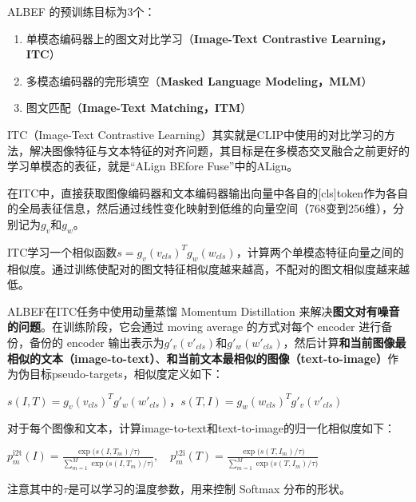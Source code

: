 \documentclass[zihao=false,fontset=windows]{ctexart}
\newcommand{\incode}[1]{\colorbox{inlinebg}{\ttfamily\small #1}}
\newcommand{\bigmath}[1]{%
  \begin{center}\large$\displaystyle #1$\end{center}%
}
\begin{document}
\par\vspace{0.95em}\par\vspace{0.28em}
ALBEF 的预训练目标为3个：\par
\begin{enumerate}
\item 单模态编码器上的图文对比学习（\textbf{Image-Text Contrastive Learning，ITC}）
\item 多模态编码器的完形填空（\textbf{Masked Language Modeling，MLM}）
\item 图文匹配（\textbf{Image-Text Matching，ITM}）
\end{enumerate}
\par\vspace{0.75em}\par\vspace{0.28em}
ITC（Image-Text Contrastive Learning）其实就是CLIP中使用的对比学习的方法，解决图像特征与文本特征的对齐问题，其目标是在多模态交叉融合之前更好的学习单模态的表征，就是“ALign BEfore Fuse”中的\textcolor{feishuRed}{ALign}。\par
在ITC中，直接获取图像编码器和文本编码器输出向量中各自的\incode{[cls]}token作为各自的全局表征信息，然后通过线性变化映射到低维的向量空间（768变到256维），分别记为$g_v$和$g_w$。\par
ITC学习一个相似函数$s=g_v(v_{cls})^T g_w(w_{cls})$，计算两个单模态特征向量之间的相似度。通过训练使配对的图文特征相似度越来越高，不配对的图文相似度越来越低。\par
ALBEF在ITC任务中使用动量蒸馏 Momentum Distillation 来解决\textbf{图文对有噪音的问题}。在训练阶段，它会通过 moving average 的方式对每个 encoder 进行备份，备份的 encoder 输出表示为$g'_v(v'_{cls})$和$g'_w(w'_{cls})$，然后计算\textbf{和当前图像最相似的文本（image-to-text）}、\textbf{和当前文本最相似的图像（text-to-image）}作为伪目标pseudo-targets，相似度定义如下：\par
$s(I,T)=g_v(v_{cls})^T g'_w(w'_{cls})$，$s(T,I)=g_w(w_{cls})^T g'_v(v'_{cls})$\par
对于每个图像和文本，计算\incode{image-to-text}和\incode{text-to-image}的归一化相似度如下：\par
\bigmath{
p_{m}^{\mathrm{i2t}}(I)=\frac{\exp\bigl(s(I,T_{m})/\tau\bigr)}{\sum_{m=1}^{M}\exp\bigl(s(I,T_{m})/\tau\bigr)},
\quad
p_{m}^{\mathrm{t2i}}(T)=\frac{\exp\bigl(s(T,I_{m})/\tau\bigr)}{\sum_{m=1}^{M}\exp\bigl(s(T,I_{m})/\tau\bigr)}
}
注意其中的$\tau$是可以学习的温度参数，用来控制 Softmax 分布的形状。\par
\end{document}
